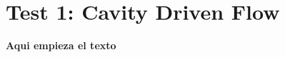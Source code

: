 \documentclass[../Dissertation]{subfiles}
\begin{document}
\section{Test 1: Cavity Driven Flow}\label{sec5:cavity}
  \textbf{Aqui empieza el texto} 
  \lipsum[1]

\end{document}
